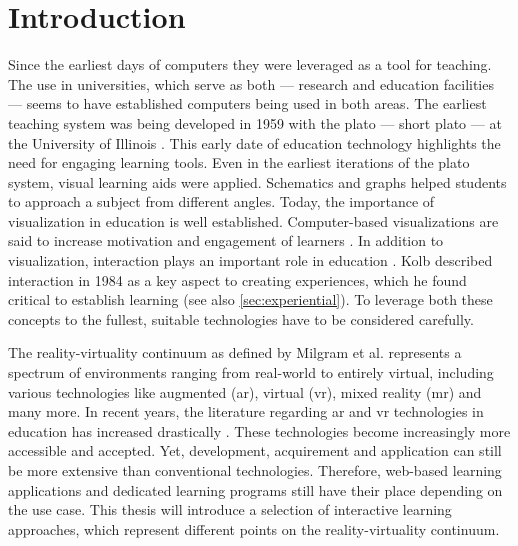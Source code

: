 %





\chapter{Introduction}
\label{sec:intro}


Since the earliest days of computers they were leveraged as a tool for teaching. The use in universities, which serve as both --- research and education facilities --- seems to have established computers being used in both areas. The earliest teaching system was being developed in 1959 with the \acrlong{plato} --- short \acrshort{plato} --- at the University of Illinois \cite{cope2023history}. This early date of education technology highlights the need for engaging learning tools. Even in the earliest iterations of the \acrshort{plato} system, visual learning aids were applied. Schematics and graphs helped students to approach a subject from different angles. Today, the importance of visualization in education is well established. Computer-based visualizations are said to increase motivation and engagement of learners \cite{vavra2011visualization}. In addition to visualization, interaction plays an important role in education \cite{firat2018towards}. Kolb described interaction in 1984 \cite{kolb:1984:experiential} as a key aspect to creating experiences, which he found critical to establish learning (see also \autoref{sec:experiential}). To leverage both these concepts to the fullest, suitable technologies have to be considered carefully.

The reality-virtuality continuum as defined by Milgram et al. \cite{milgram1994arc} represents a spectrum of environments ranging from real-world to entirely virtual, including various technologies like augmented (\acrshort{ar}), virtual (\acrshort{vr}), mixed reality (\acrshort{mr}) and many more. In recent years, the literature regarding \acrshort{ar} and \acrshort{vr} technologies in education has increased drastically \cite{alansi2023analyzing}. These technologies become increasingly more accessible and accepted. Yet, development, acquirement and application can still be more extensive than conventional technologies. Therefore, web-based learning applications and dedicated learning programs still have their place depending on the use case. This thesis will introduce a selection of interactive learning approaches, which represent different points on the reality-virtuality continuum. 


